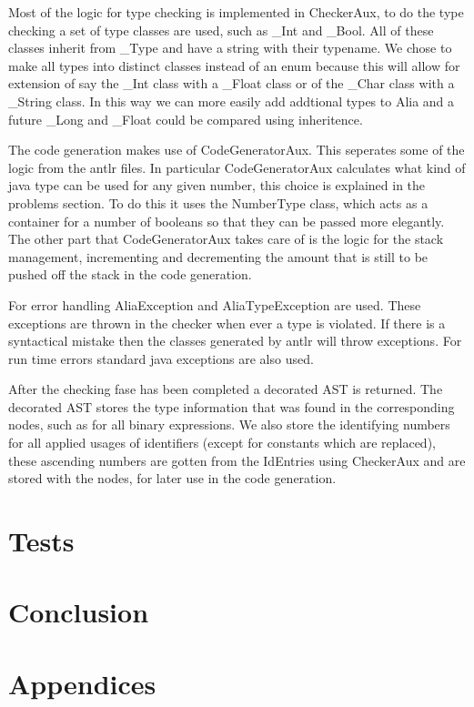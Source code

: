 \documentclass[paper=a4, fontsize=11pt]{article}
\numberwithin{equation}{section}		%
\numberwithin{figure}{section}			%
\numberwithin{table}{section}				%
\begin{document}
Most of the logic for type checking is implemented in CheckerAux, to do the type checking a set of type classes are used, such as \_Int and \_Bool. All of these classes inherit from \_Type and have a string with their typename. We chose to make all types into distinct classes instead of an enum because this will allow for extension of say the \_Int class with a \_Float class or of the \_Char class with a \_String class. In this way we can more easily add addtional types to Alia and a future \_Long and \_Float could be compared using inheritence.

The code generation makes use of CodeGeneratorAux. This seperates some of the logic from the antlr files. In particular CodeGeneratorAux calculates what kind of java type can be used for any given number, this choice is explained in the problems section. To do this it uses the NumberType class, which acts as a container for a number of booleans so that they can be passed more elegantly. The other part that CodeGeneratorAux takes care of is the logic for the stack management, incrementing and decrementing the amount that is still to be pushed off the stack in the code generation.

For error handling AliaException and AliaTypeException are used. These exceptions are thrown in the checker when ever a type is violated. If there is a syntactical mistake then the classes generated by antlr will throw exceptions. For run time errors standard java exceptions are also used.

After the checking fase has been completed a decorated AST is returned. The decorated AST stores the type information that was found in the corresponding nodes, such as for all binary expressions. We also store the identifying numbers for all applied usages of identifiers (except for constants which are replaced), these ascending numbers are gotten from the IdEntries using CheckerAux and are stored with the nodes, for later use in the code generation.
\section{Tests}

\section{Conclusion}
\section{Appendices}
% 
\end{document}

